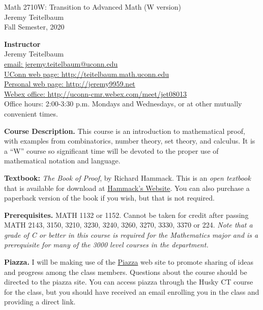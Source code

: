 \documentclass[12pt]{article}
\begin{document}
\begin{center} Math 2710W: Transition to Advanced Math (W version)\\
Jeremy Teitelbaum \\ Fall Semester, 2020
\end{center}

{\bf Instructor}\\
Jeremy Teitelbaum \\
\href{mailto:jeremy.teitelbaum@uconn.edu}{email: jeremy.teitelbaum@uconn.edu} \\
\href{http://teitelbaum.math.uconn.edu}{UConn web page: http://teitelbaum.math.uconn.edu} \\
\href{http://jeremy9959.net}{Personal web page: http://jeremy9959.net} \\
\href{http://uconn-cmr.webex.com/meet/jet08013}{Webex office: http://uconn-cmr.webex.com/meet/jet08013} \\
Office hours: 2:00-3:30 p.m. Mondays and Wednesdays, or at other mutually convenient times.  

{\bf Course Description.} This course is an introduction to mathematical proof, with examples from
combinatorics, number theory, set theory, and calculus.  It is a ``W'' course so significant time
will be devoted to the proper use of mathematical notation and language.


{\bf Textbook:} {\it The Book of Proof}, by Richard Hammack.  This is an {\it open textbook} that is available
for download at \href{https://www.people.vcu.edu/~rhammack/BookOfProof}{Hammack's Website}. You can also purchase a paperback
version of the book if you wish, but that is not required. 

{\bf Prerequisites.} MATH 1132 or 1152. Cannot be taken for credit after passing MATH 2143, 3150, 3210, 3230, 3240, 3260, 3270, 3330, 3370 or 224. {\it Note that a grade of C or better in this course is required for the Mathematics major and is a prerequisite for many of the 3000 level courses in the department.}



{\bf Piazza.} I will be making use of the \href{https://piazza.com/class/kcp1cyt4u5r440}{Piazza}
web site to promote sharing of ideas and progress among the class members.
Questions about the course should be directed to the piazza site.  You can access piazza
through the Husky CT course for the class, but you should have received an email enrolling
you in the class and providing a direct link.
\end{document}
